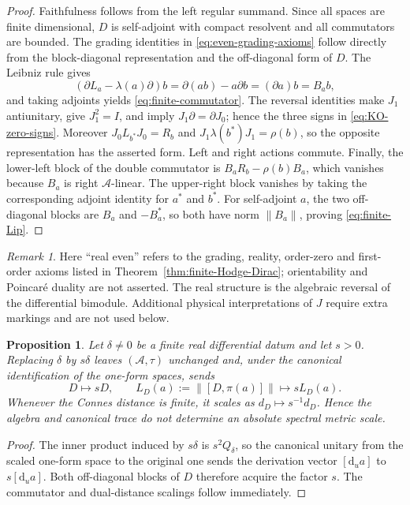 \documentclass[11pt]{article}
\newtheorem{proposition}[proposition]{Proposition}
\theoremstyle{definition}
\theoremstyle{remark}
\newtheorem{remark}[remark]{Remark}
\theoremstyle{definition}
\theoremstyle{remark}
\newcommand{\dd}{\mathrm d}
\newcommand{\A}{\mathcal A}
\begin{document}
\begin{proof}
Faithfulness follows from the left regular summand.  Since all spaces are finite
dimensional, $D$ is self-adjoint with compact resolvent and all commutators are
bounded.  The grading identities in \eqref{eq:even-grading-axioms} follow directly
from the block-diagonal representation and the off-diagonal form of $D$.
The Leibniz rule gives
\[
 (\partial L_a-\lambda(a)\partial)b
 =\partial(ab)-a\partial b=(\partial a)b=B_ab,
\]
and taking adjoints yields \eqref{eq:finite-commutator}.  The reversal identities
make $J_1$ antiunitary, give $J_1^2=I$, and imply
$J_1\partial=\partial J_0$; hence the three signs in
\eqref{eq:KO-zero-signs}.  Moreover $J_0L_{b^*}J_0=R_b$ and
$J_1\lambda(b^*)J_1=\rho(b)$, so the opposite representation has the asserted
form.  Left and right actions commute.  Finally, the lower-left block of the
double commutator is $B_aR_b-\rho(b)B_a$, which vanishes because $B_a$ is right
$\A$-linear.  The upper-right block vanishes by taking the corresponding
adjoint identity for $a^*$ and $b^*$.  For self-adjoint $a$, the two
off-diagonal blocks are $B_a$ and $-B_a^*$, so both have norm $\|B_a\|$,
proving \eqref{eq:finite-Lip}.
\end{proof}

\begin{remark}
Here ``real even'' refers to the grading, reality, order-zero and first-order
axioms listed in Theorem~\ref{thm:finite-Hodge-Dirac}; orientability and
Poincar\'e duality are not asserted.  The real structure is the algebraic reversal
of the differential bimodule.  Additional physical interpretations of $J$ require
extra markings and are not used below.
\end{remark}

\begin{proposition}
\label{prop:no-scale}
Let $\delta\neq0$ be a finite real differential datum and let $s>0$.  Replacing
$\delta$ by $s\delta$ leaves $(\A,\tau)$ unchanged and, under the canonical
identification of the one-form spaces, sends
\begin{equation}
 D\longmapsto sD,
 \qquad
 L_D(a):=\|[D,\pi(a)]\|\longmapsto sL_D(a).
 \label{eq:scale-D}
\end{equation}
Whenever the Connes distance is finite, it scales as
$d_D\mapsto s^{-1}d_D$.  Hence the algebra and canonical trace do not determine an
absolute spectral metric scale.
\end{proposition}

\begin{proof}
The inner product induced by $s\delta$ is $s^2Q_\delta$, so the canonical unitary
from the scaled one-form space to the original one sends the derivation vector
$[\dd_u a]$ to $s[\dd_u a]$.  Both off-diagonal blocks of $D$ therefore acquire the
factor $s$.  The commutator and dual-distance scalings follow immediately.
\end{proof}
\end{document}
